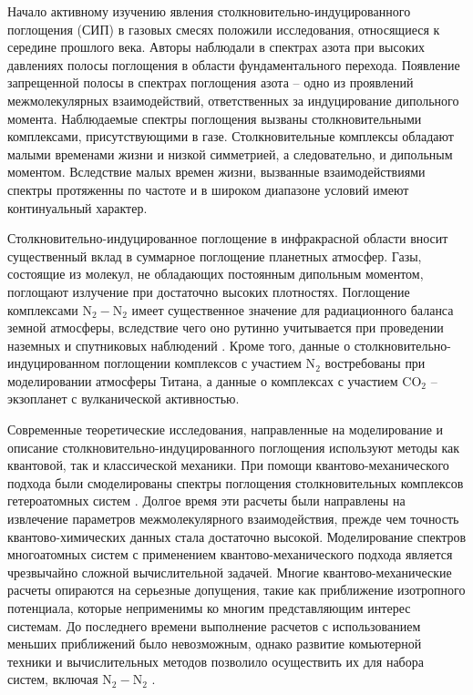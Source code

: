 Начало активному изучению явления столкновительно-индуцированного поглощения (СИП) в газовых смесях положили исследования, относящиеся к середине прошлого века. Авторы \cite{crawford1949} наблюдали в спектрах азота при высоких давлениях полосы поглощения в области фундаментального перехода. Появление запрещенной полосы в спектрах поглощения азота -- одно из проявлений межмолекулярных взаимодействий, ответственных за индуцирование дипольного момента. Наблюдаемые спектры поглощения вызваны столкновительными комплексами, присутствующими в газе. Столкновительные комплексы обладают малыми временами жизни и низкой симметрией, а следовательно, и дипольным моментом. Вследствие малых времен жизни, вызванные взаимодействиями спектры протяженны по частоте и в широком диапазоне условий имеют континуальный характер. \par 
Столкновительно-индуцированное поглощение в инфракрасной области вносит существенный вклад в суммарное поглощение планетных атмосфер. Газы, состоящие из молекул, не обладающих постоянным дипольным моментом, поглощают излучение при достаточно высоких плотностях. Поглощение комплексами N$_2-$N$_2$ имеет существенное значение для радиационного баланса земной атмосферы, вследствие чего оно рутинно учитывается при проведении наземных и спутниковых наблюдений \cite{sioris2014}. Кроме того, данные о столкновительно-индуцированном поглощении комплексов с участием N$_2$ востребованы при моделировании атмосферы Титана, а данные о комплексах с участием CO$_2$ -- экзопланет с вулканической активностью. \par
Современные теоретические исследования, направленные на моделирование и описание столкновительно-индуцированного поглощения используют методы как квантовой, так и классической механики. При помощи квантово-механического подхода были смоделированы спектры поглощения столкновительных комплексов гетероатомных систем \cite{sharma1975, meyer1986}. Долгое время эти расчеты были направлены на извлечение параметров межмолекулярного взаимодействия, прежде чем точность квантово-химических данных стала достаточно высокой. Моделирование спектров многоатомных систем с применением квантово-механического подхода является чрезвычайно сложной вычислительной задачей. Многие квантово-механические расчеты опираются на серьезные допущения, такие как приближение изотропного потенциала, которые неприменимы ко многим представляющим интерес системам. До последнего времени выполнение расчетов с использованием меньших приближений было невозможным, однако развитие комьютерной техники и вычислительных методов позволило осуществить их для набора систем, включая N$_2-$N$_2$ \cite{karman2015}. \par
